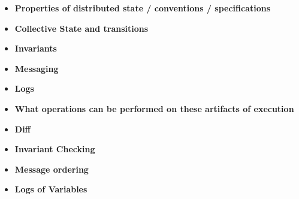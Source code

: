 \begin{itemize}
    \item \textbf{Properties of distributed state / conventions / specifications}
    \item \textbf{Collective State and transitions}
    \item \textbf{Invariants}
    \item \textbf{Messaging}
    \item \textbf{Logs}
    \item \textbf{What operations can be performed on these artifacts of execution}
    \item \textbf{Diff}
    \item \textbf{Invariant Checking}
    \item \textbf{Message ordering}
    \item \textbf{Logs of Variables}
\end{itemize}

